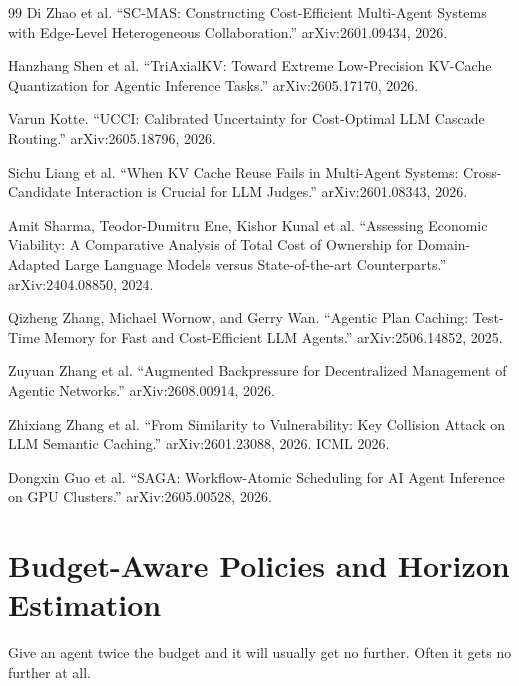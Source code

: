 \documentclass[11pt]{book}
\begin{document}
\begin{thebibliography}{99}
Di Zhao et al.
``SC-MAS: Constructing Cost-Efficient Multi-Agent Systems with Edge-Level Heterogeneous Collaboration.''
arXiv:2601.09434, 2026.

Hanzhang Shen et al.
``TriAxialKV: Toward Extreme Low-Precision KV-Cache Quantization for Agentic Inference Tasks.''
arXiv:2605.17170, 2026.

Varun Kotte.
``UCCI: Calibrated Uncertainty for Cost-Optimal LLM Cascade Routing.''
arXiv:2605.18796, 2026.

Sichu Liang et al.
``When KV Cache Reuse Fails in Multi-Agent Systems: Cross-Candidate Interaction is Crucial for LLM Judges.''
arXiv:2601.08343, 2026.

Amit Sharma, Teodor-Dumitru Ene, Kishor Kunal et al.
``Assessing Economic Viability: A Comparative Analysis of Total Cost of Ownership
for Domain-Adapted Large Language Models versus State-of-the-art Counterparts.''
arXiv:2404.08850, 2024.

Qizheng Zhang, Michael Wornow, and Gerry Wan.
``Agentic Plan Caching: Test-Time Memory for Fast and Cost-Efficient LLM Agents.''
arXiv:2506.14852, 2025.

Zuyuan Zhang et al.
``Augmented Backpressure for Decentralized Management of Agentic Networks.''
arXiv:2608.00914, 2026.

Zhixiang Zhang et al.
``From Similarity to Vulnerability: Key Collision Attack on LLM Semantic Caching.''
arXiv:2601.23088, 2026. ICML 2026.

Dongxin Guo et al.
``SAGA: Workflow-Atomic Scheduling for AI Agent Inference on GPU Clusters.''
arXiv:2605.00528, 2026.
\end{thebibliography}

\chapter{Budget-Aware Policies and Horizon Estimation}
\label{ch:budgets}

Give an agent twice the budget and it will usually get no further. Often it gets no further at all.
\end{document}
